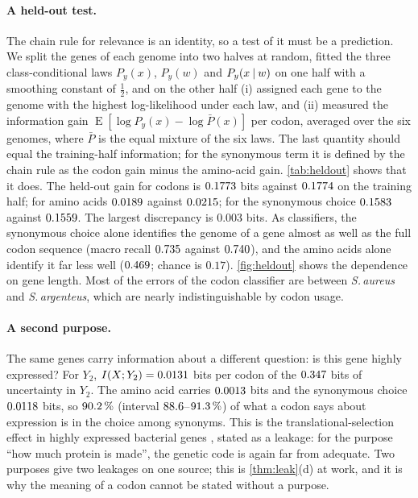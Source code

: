\paragraph{A held-out test.} The chain rule for relevance is an identity, so a test of it must be a prediction. We split the genes of each genome into two halves at random, fitted the three class-conditional laws $P_y(x)$, $P_y(w)$ and $P_y(x\mathbin{\vert} w)$ on one half with a smoothing constant of $\tfrac12$, and on the other half (i) assigned each gene to the genome with the highest log-likelihood under each law, and (ii) measured the information gain $\operatorname{E}[\log P_y(x)-\log\bar P(x)]$ per codon, averaged over the six genomes, where $\bar P$ is the equal mixture of the six laws. The last quantity should equal the training-half information; for the synonymous term it is defined by the chain rule as the codon gain minus the amino-acid gain.
\cref{tab:heldout} shows that it does. The held-out gain for codons is $0.1773$ bits against $0.1774$ on the training half; for amino acids $0.0189$ against $0.0215$; for the synonymous choice $0.1583$ against $0.1559$. The largest discrepancy is $0.003$ bits. As classifiers, the synonymous choice alone identifies the genome of a gene almost as well as the full codon sequence (macro recall $0.735$ against $0.740$), and the amino acids alone identify it far less well ($0.469$; chance is $0.17$). \cref{fig:heldout} shows the dependence on gene length. Most of the errors of the codon classifier are between \emph{S.\,aureus} and \emph{S.\,argenteus}, which are nearly indistinguishable by codon usage.
\begin{table}[tbp]
\caption{Held-out test of the relevance ledger on $\HoldGenes$ genes: information per codon under the law fitted on the other half, and identification of the genome of a gene by the evidence shown.}\label{tab:heldout}
\centering\small

\end{table}

\paragraph{A second purpose.} The same genes carry information about a different question: is this gene highly expressed? For $Y_2$, $I(X;Y_2)=0.0131$ bits per codon of the $0.347$ bits of uncertainty in $Y_2$. The amino acid carries $0.0013$ bits and the synonymous choice $0.0118$ bits, so $90.2\,\%$ (interval $88.6$--$91.3\,\%$) of what a codon says about expression is in the choice among synonyms. This is the translational-selection effect in highly expressed bacterial genes \citep{gouy1982,sharp1987}, stated as a leakage: for the purpose ``how much protein is made'', the genetic code is again far from adequate. Two purposes give two leakages on one source; this is \cref{thm:leak}(d) at work, and it is why the meaning of a codon cannot be stated without a purpose.

